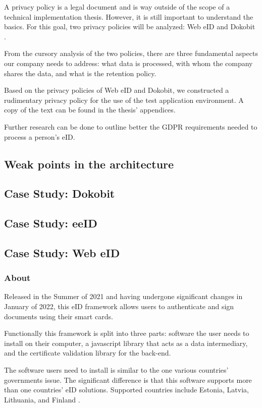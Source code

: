 A privacy policy is a legal document and is way outside of the scope of a technical implementation thesis. However, it is still important to understand the basics. For this goal, two privacy policies will be analyzed: Web eID \cite{legal-webeid-privacypolicy} and Dokobit \cite{legal-dokobit-privacypolicy}.

From the cursory analysis of the two policies, there are three fundamental aspects our company needs to address: what data is processed, with whom the company shares the data, and what is the retention policy.

Based on the privacy policies of Web eID and Dokobit, we constructed a rudimentary privacy policy for the use of the test application environment. A copy of the text can be found in the thesis' appendices.

Further research can be done to outline better the GDPR requirements needed to process a person's eID.

\subsection{Weak points in the architecture}
\subsection{Case Study: Dokobit}
\subsection{Case Study: eeID}
\subsection{Case Study: Web eID}

\subsubsection{About}

Released in the Summer of 2021 \cite{ria-webeid} and having undergone significant changes in January of 2022, this eID framework allows users to authenticate and sign documents using their smart cards.

Functionally this framework is split into three parts: software the user needs to install on their computer, a javascript library that acts as a data intermediary, and the certificate validation library for the back-end.

The software users need to install is similar to the one various countries' governments issue. The significant difference is that this software supports more than one countries' eID solutions. Supported countries include Estonia, Latvia, Lithuania, and Finland \cite{ria-webeid}.

